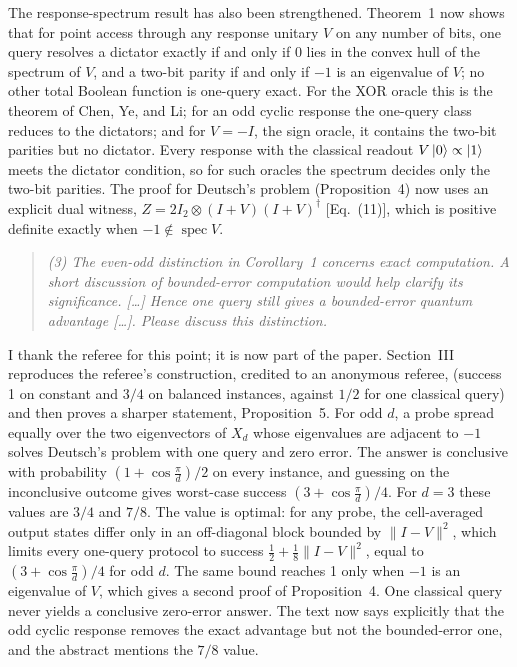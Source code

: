 \documentclass[11pt]{article}
\newenvironment{referee}{\begin{quote}\itshape}{\end{quote}}
\begin{document}
The response-spectrum result has also been strengthened. Theorem~1 now shows
that for point access through any response unitary \(V\) on any number of
bits, one query resolves a dictator exactly if and only if \(0\) lies in the
convex hull of the spectrum of \(V\), and a two-bit parity if and only if
\(-1\) is an eigenvalue of \(V\); no other total Boolean function is one-query
exact. For the
XOR oracle this is the theorem of Chen, Ye, and Li; for an odd cyclic response
the one-query class reduces to the dictators; and for \(V=-I\), the sign oracle,
it contains the two-bit parities but no dictator. Every response with the
classical readout \(V\ket0\propto\ket1\) meets the dictator condition, so for
such oracles the spectrum decides only the two-bit parities. The proof for
Deutsch's problem (Proposition~4) now uses an explicit dual witness, \(Z=2I_2\otimes(I+V)(I+V)^\dagger\) [Eq.~(11)],
which is positive definite exactly when \(-1\notin\operatorname{spec}V\).

\begin{referee}
(3) The even-odd distinction in Corollary~1 concerns exact computation. A
short discussion of bounded-error computation would help clarify its
significance. [\dots] Hence one query still gives a bounded-error quantum
advantage [\dots]. Please discuss this distinction.
\end{referee}

I thank the referee for this point; it is now part of the paper. Section~III
reproduces the referee's construction, credited to an anonymous referee, (success 1 on constant and \(3/4\) on
balanced instances, against \(1/2\) for one classical query) and then proves a
sharper statement, Proposition~5. For odd \(d\), a probe spread equally over
the two eigenvectors of \(X_d\) whose eigenvalues are adjacent to \(-1\)
solves Deutsch's problem with one query and zero error. The answer is
conclusive with probability \((1+\cos\frac{\pi}{d})/2\) on every instance, and
guessing on the inconclusive outcome gives worst-case success
\((3+\cos\frac{\pi}{d})/4\). For \(d=3\) these values are \(3/4\) and \(7/8\).
The value is optimal: for any probe, the cell-averaged output states differ
only in an off-diagonal block bounded by \(\lVert I-V\rVert^2\), which limits
every one-query protocol to success \(\frac12+\frac18\lVert I-V\rVert^2\), equal
to \((3+\cos\frac{\pi}{d})/4\) for odd \(d\). The same bound reaches 1 only when
\(-1\) is an eigenvalue of \(V\), which gives a second proof of Proposition~4. One
classical query never yields a conclusive zero-error answer. The text now says explicitly that the odd cyclic response
removes the exact advantage but not the bounded-error one, and the abstract
mentions the \(7/8\) value.
\end{document}
